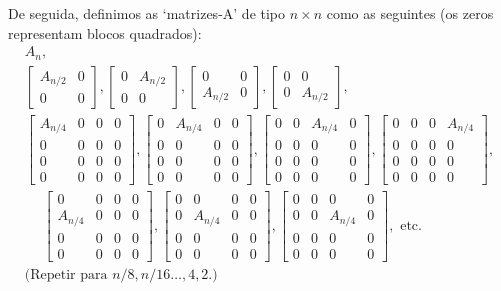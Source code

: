 \documentclass{article}
\begin{document}
De seguida, definimos as `matrizes-A' de tipo $n \times n$ como as seguintes (os zeros representam blocos quadrados):
\begin{gather*}
A_n,\\
\begin{bmatrix}
A_{n/2} & 0\\
0 & 0
\end{bmatrix},
\begin{bmatrix}
0 & A_{n/2}\\
0 & 0
\end{bmatrix},
\begin{bmatrix}
0 & 0\\
A_{n/2} & 0
\end{bmatrix},
\begin{bmatrix}
0 & 0\\
0 & A_{n/2}
\end{bmatrix},\\
\begin{bmatrix}
A_{n/4} & 0 & 0 & 0\\
0 & 0 & 0 & 0\\
0 & 0 & 0 & 0\\
0 & 0 & 0 & 0
\end{bmatrix},
\begin{bmatrix}
0 & A_{n/4} & 0 & 0\\
0 & 0 & 0 & 0\\
0 & 0 & 0 & 0\\
0 & 0 & 0 & 0
\end{bmatrix},
\begin{bmatrix}
0 & 0 & A_{n/4} & 0\\
0 & 0 & 0 & 0\\
0 & 0 & 0 & 0\\
0 & 0 & 0 & 0
\end{bmatrix},
\begin{bmatrix}
0 & 0 & 0 & A_{n/4}\\
0 & 0 & 0 & 0\\
0 & 0 & 0 & 0\\
0 & 0 & 0 & 0
\end{bmatrix},\\
\quad\;
\begin{bmatrix}
0 & 0 & 0 & 0\\
A_{n/4} & 0 & 0 & 0\\
0 & 0 & 0 & 0\\
0 & 0 & 0 & 0
\end{bmatrix},
\begin{bmatrix}
0 & 0 & 0 & 0\\
0 & A_{n/4} & 0 & 0\\
0 & 0 & 0 & 0\\
0 & 0 & 0 & 0
\end{bmatrix},
\begin{bmatrix}
0 & 0 & 0 & 0\\
0 & 0 & A_{n/4} & 0\\
0 & 0 & 0 & 0\\
0 & 0 & 0 & 0
\end{bmatrix}, \text{ etc.}\\
\text{(Repetir para $n/8, n/16 \dots, 4, 2.$)}
\end{gather*}
\end{document}
